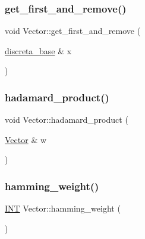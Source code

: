 \mbox{\label{class_vector_ad2f9bf9820e09ff09e3c99d1c983ab96}} 
\subsubsection{\texorpdfstring{get\+\_\+first\+\_\+and\+\_\+remove()}{get\_first\_and\_remove()}}
{\footnotesize\ttfamily void Vector\+::get\+\_\+first\+\_\+and\+\_\+remove (\begin{DoxyParamCaption}\item[{\mbox{\hyperlink{classdiscreta__base}{discreta\+\_\+base}} \&}]{x }\end{DoxyParamCaption})}

\mbox{\label{class_vector_a36312785f92e4dfb892cdb85c4444247}} 
\subsubsection{\texorpdfstring{hadamard\+\_\+product()}{hadamard\_product()}}
{\footnotesize\ttfamily void Vector\+::hadamard\+\_\+product (\begin{DoxyParamCaption}\item[{\mbox{\hyperlink{class_vector}{Vector}} \&}]{w }\end{DoxyParamCaption})}

\mbox{\label{class_vector_a53a1b391aad5db6fe6af3b67781f87cf}} 
\subsubsection{\texorpdfstring{hamming\+\_\+weight()}{hamming\_weight()}}
{\footnotesize\ttfamily \mbox{\hyperlink{galois_8h_a09fddde158a3a20bd2dcadb609de11dc}{I\+NT}} Vector\+::hamming\+\_\+weight (\begin{DoxyParamCaption}{ }\end{DoxyParamCaption})}

\mbox{\label{class_vector_a1eb7508c3c31d85829d0d8361526c770}} 
